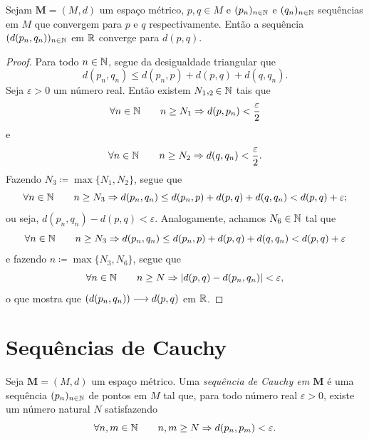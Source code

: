 \begin{prop}
	Sejam $\bm M = (M,d)$ um espaço métrico, $p,q \in M$ e $(p_n)_{n \in \mathbb{N}}$ e $(q_n)_{n \in \mathbb{N}}$ sequências em $M$ que convergem para $p$ e $q$ respectivamente. Então a sequência $(d(p_n,q_n))_{n \in \mathbb{N}}$ em $\mathbb{R}$ converge para $d(p,q)$.
\end{prop}
\begin{proof}
	Para todo $n \in \mathbb{N}$, segue da desigualdade triangular que
	\begin{equation*}
	d(p_n,q_n) \leq d(p_n,p) + d(p,q) + d(q,q_n).
	\end{equation*}
Seja $\varepsilon > 0$ um número real. Então existem $N_1,_2 \in \mathbb{N}$ tais que
	\begin{equation*}
	\forall n \in \mathbb{N} \qquad n \geq N_1 \Rightarrow d(p,p_n) < \frac{\varepsilon}{2}
	\end{equation*}
e
	\begin{equation*}
	\forall n \in \mathbb{N} \qquad n \geq N_2 \Rightarrow d(q,q_n) < \frac{\varepsilon}{2}.
	\end{equation*}
Fazendo $N_3 \coloneqq \max\{N_1,N_2\}$, segue que
	\begin{equation*}
	\forall n \in \mathbb{N} \qquad n \geq N_3 \Rightarrow d(p_n,q_n) \leq d(p_n,p) + d(p,q) + d(q,q_n) < d(p,q) + \varepsilon;
	\end{equation*}
ou seja, $d(p_n,q_n) - d(p,q) < \varepsilon$. Analogamente, achamos $N_6 \in \mathbb{N}$ tal que
	\begin{equation*}
	\forall n \in \mathbb{N} \qquad n \geq N_3 \Rightarrow d(p_n,q_n) \leq d(p_n,p) + d(p,q) + d(q,q_n) < d(p,q) + \varepsilon
	\end{equation*}
e fazendo $n \coloneqq \max\{N_3,N_6\}$, segue que
	\begin{equation*}
	\forall n \in \mathbb{N} \qquad n \geq N \Rightarrow |d(p,q) - d(p_n,q_n)| < \varepsilon,
	\end{equation*}
o que mostra que $(d(p_n,q_n)) \longrightarrow d(p,q)$ em $\mathbb{R}$.
	
\end{proof}


\section{Sequências de Cauchy}

\begin{defi}
	Seja $\bm M = (M,d)$ um espaço métrico. Uma \emph{sequência de Cauchy em $\bm M$} é uma sequência $(p_n)_{n \in \mathbb{N}}$ de pontos em $M$ tal que, para todo número real $\varepsilon > 0$, existe um número natural $N$ satisfazendo
	\begin{equation*}
	\forall n,m \in \mathbb{N} \qquad n,m \geq N \Rightarrow d(p_n,p_m) < \varepsilon.
	\end{equation*}
\end{defi}

